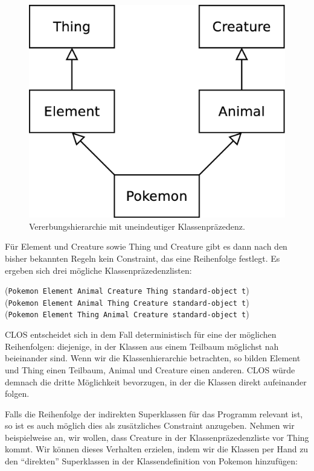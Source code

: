 \begin{figure}[h]
 \centering
 \includegraphics[scale=0.3]{pictures/creature}
 \caption{Vererbungshierarchie mit uneindeutiger Klassenpräzedenz.}
 \label{creature}
\end{figure}

Für Element und Creature sowie Thing und Creature gibt es dann nach den bisher bekannten Regeln kein Constraint, das eine Reihenfolge festlegt. Es ergeben sich drei mögliche Klassenpräzedenzlisten:

(\texttt{Pokemon Element Animal Creature Thing standard-object t})\\
(\texttt{Pokemon Element Animal Thing Creature standard-object t})\\ 
(\texttt{Pokemon Element Thing Animal Creature standard-object t})

CLOS entscheidet sich in dem Fall deterministisch für eine der möglichen Reihenfolgen: diejenige, in der Klassen aus einem Teilbaum möglichst nah beieinander sind. Wenn wir die Klassenhierarchie betrachten, so bilden Element und Thing einen Teilbaum, Animal und Creature einen anderen. CLOS würde demnach die dritte Möglichkeit bevorzugen, in der die Klassen direkt aufeinander folgen.

Falls die Reihenfolge der indirekten Superklassen für das Programm relevant ist, so ist es auch möglich dies als zusätzliches Constraint anzugeben. Nehmen wir beispielweise an, wir wollen, dass Creature in der Klassenpräzedenzliste vor Thing kommt. Wir können dieses Verhalten erzielen, indem wir die Klassen per Hand zu den ``direkten'' Superklassen in der Klassendefinition von Pokemon hinzufügen:

